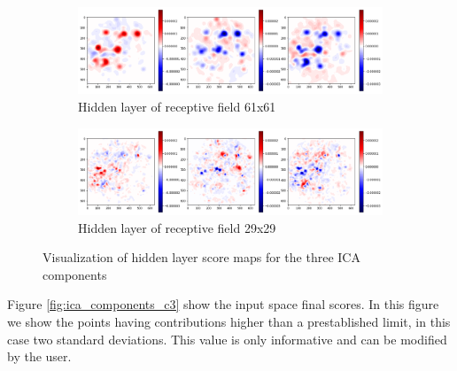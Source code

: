 \documentclass{llncs}
\begin{document}
\begin{figure}[h!]
	\centering
	\begin{subfigure}[b]{\textwidth}
		\centering
		\includegraphics[width=\textwidth]{./figures/c3/rf61.png}
		\caption{Hidden layer of receptive field 61x61}	
	\end{subfigure}
	\begin{subfigure}[b]{\textwidth}
		\centering
		\includegraphics[width=\textwidth]{./figures/c3/rf29.png}
		\caption{Hidden layer of receptive field 29x29}
	\end{subfigure}
	\hfill 
\caption{Visualization of hidden layer score maps for the three ICA components}  
	\label{fig:ica_components_hidden} 
\end{figure}

Figure \ref{fig:ica_components_c3} show the input space final scores. In this figure we show the points having contributions higher than a prestablished limit, in this case two standard deviations. This value is only informative and can be modified by the user.
\end{document}
